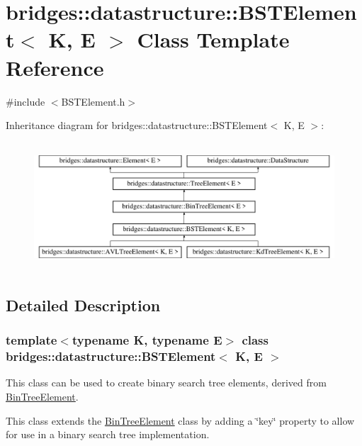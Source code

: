 \hypertarget{classbridges_1_1datastructure_1_1_b_s_t_element}{}\section{bridges\+:\+:datastructure\+:\+:B\+S\+T\+Element$<$ K, E $>$ Class Template Reference}
\label{classbridges_1_1datastructure_1_1_b_s_t_element}


{\ttfamily \#include $<$B\+S\+T\+Element.\+h$>$}

Inheritance diagram for bridges\+:\+:datastructure\+:\+:B\+S\+T\+Element$<$ K, E $>$\+:\begin{figure}[H]
\begin{center}
\leavevmode
\includegraphics[height=4.794520cm]{classbridges_1_1datastructure_1_1_b_s_t_element}
\end{center}
\end{figure}


\subsection{Detailed Description}
\subsubsection*{template$<$typename K, typename E$>$\newline
class bridges\+::datastructure\+::\+B\+S\+T\+Element$<$ K, E $>$}

This class can be used to create binary search tree elements, derived from \mbox{\hyperlink{classbridges_1_1datastructure_1_1_bin_tree_element}{Bin\+Tree\+Element}}. 

This class extends the \mbox{\hyperlink{classbridges_1_1datastructure_1_1_bin_tree_element}{Bin\+Tree\+Element}} class by adding a \char`\"{}key\char`\"{} property to allow for use in a binary search tree implementation.

